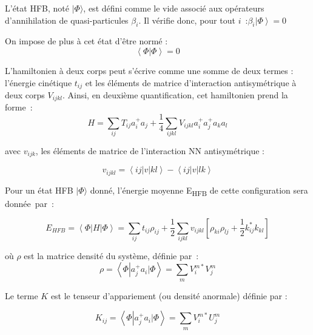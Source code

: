 L’état HFB, noté $|\Phi\rangle$, est défini comme le vide associé aux opérateurs d’annihilation de quasi-particules $\beta_i$. Il vérifie donc, pour tout $i$ :$\beta _i |\left.\Phi \right\rangle =0$

On impose de plus à cet état d’être normé :       
\begin{equation}\left\langle \Phi \left|\Phi \right.\right\rangle
=0\end{equation}
           
L’hamiltonien à deux corps peut s'écrive comme une somme de deux termes : l'énergie cinétique $t_{ij}$ et les éléments de matrice d'interaction antisymétrique à deux corps $V_{ijkl}$. Ainsi, en deuxième quantification, cet hamiltonien prend la forme :
\begin{equation}H=\sum
_{\mathit{ij}}T_{\mathit{ij}}a_i^{+}a_j+\frac 1 4\sum
_{\mathit{ijkl}}V_{\mathit{ijkl}} a_i^{+}a_j^{+}a_k a_l\end{equation}


avec $v_{ijk}$, les éléments de matrice de l’interaction NN antisymétrique :

\begin{equation}v_{\mathit{ijkl}}=\left\langle \mathit{ij}\left|v\left|\mathit{kl}\right.\right.\right\rangle -\left\langle
\mathit{ij}\left|v\left|\mathit{lk}\right.\right.\right\rangle\end{equation}


Pour un état HFB  $| \Phi \rangle $ donné, l’énergie moyenne E\textsubscript{HFB} de cette configuration sera donnée par :

\begin{equation}E_{\mathit{HF}B}=\left\langle \Phi \left|H\left|\Phi \right.\right.\right\rangle =\sum
_{\mathit{ij}}t_{\mathit{ij}}\rho _{\mathit{ij}}+\frac 1 2\sum _{\mathit{ijkl}}v_{\mathit{ijkl}}\left[\rho
_{\mathit{ki}}\rho _{\mathit{lj}}+\frac 1 2k_{\mathit{ij}}^{\ast }k_{\mathit{kl}}\right]\end{equation}


où $\rho $ est la matrice densité du système, définie par :
\begin{equation}\rho =\left\langle \Phi
\left|a_j^{+}a_i\left|\Phi \right.\right.\right\rangle =\sum _mV_i^{m\ast
}V_j^m\end{equation}


Le terme $K$ est le tenseur d’appariement (ou densité anormale) définie par :

\begin{equation}K_{\mathit{ij}}=\left\langle \Phi
\left|a_j^{+}a_i\left|\Phi \right.\right.\right\rangle =\sum _mV_i^{m\ast
}U_j^m\end{equation}


